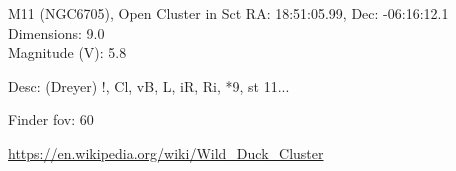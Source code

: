 \begin{block}{M11 (NGC6705), Open Cluster in Sct}
    RA: 18:51:05.99, Dec: -06:16:12.1 \\ 
    Dimensions: 9.0 \\ 
    Magnitude (V): 5.8


    Desc: (Dreyer) !, Cl, vB, L, iR, Ri, *9, st 11... 

    Finder fov: 60 

    \url{https://en.wikipedia.org/wiki/Wild_Duck_Cluster} 
\end{block}